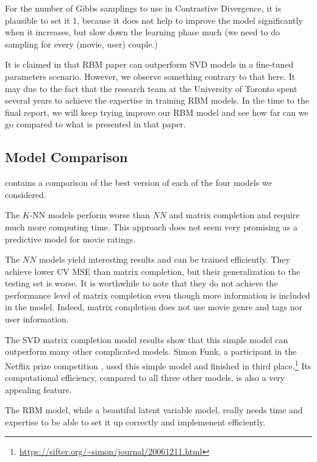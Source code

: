 \documentclass[bj, preprint]{imsart}
\begin{document}
For the number of Gibbs samplings to use in Contrastive Divergence, it is plausible to set it 1, because it does not help to improve the model significantly when it increases, but slow down the learning phase much (we need to do sampling for every (movie, user) couple.)

It is claimed in \cite{10.1145/1273496.1273596} that RBM paper can outperform SVD models in a fine-tuned parameters scenario. However, we observe something contrary to that here. It may due to the fact that the research team at the University of Toronto spent several years to achieve the expertise in training RBM models. In the time to the final report, we will keep trying improve our RBM model and see how far can we go compared to what is presented in that paper.

\subsection{Model Comparison}\label{sebsec:results.model}

 contains a comparison of the best version of each of the four models we considered. 

The $K$-NN models perform worse than $NN$ and matrix completion and require much more computing time. This approach does not seem very promising as a predictive model for movie ratings.

The $NN$ models yield interesting results and can be trained efficiently. They achieve lower CV MSE than matrix completion, but their generalization to the testing set is worse. It is worthwhile to note that they do not achieve the performance level of matrix completion even though more information is included in the model. Indeed, matrix completion does not use movie genre and tags nor user information.

The SVD matrix completion model results show that this simple model can outperform many other complicated models. Simon Funk, a participant in the Netflix prize competition \citep{bennett2007netflix}, used this simple model and finished in third place.\footnote{\url{https://sifter.org/~simon/journal/20061211.html}} Its computational efficiency, compared to all three other models, is also a very appealing feature.

The RBM model, while a beautiful latent variable model, really needs time and expertise to be able to set it up correctly and implemenent efficiently.  
\end{document}
